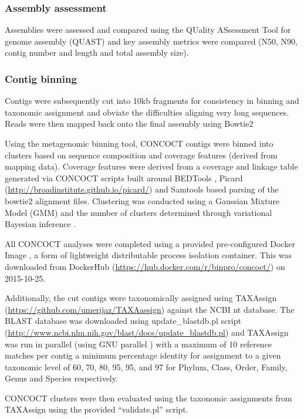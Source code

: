 \subsubsection{Assembly assessment}

Assemblies were assessed and compared using the
QUality ASsessment Tool for genome assembly (QUAST) \citep{Gurevich2013a}
and key assembly metrics were compared (N50, N90, contig number
and length and total assembly size).


\subsubsection{Contig binning}
Contigs were subsequently cut into 10kb fragments for consistency
in binning and taxonomic assignment and obviate the difficulties
aligning very long sequences. 
Reads were then mapped back onto the final assembly using Bowtie2 
\citep{Langmead2012} 

Using the metagenomic binning tool, CONCOCT \citep{Alneberg2014}
contigs were binned into clusters based on sequence composition
and coverage features (derived from mapping data).
Coverage features were derived from a coverage and linkage table
generated via CONCOCT scripts built around BEDTools \citep{Quinlan2010,Quinlan2014}, Picard (\url{http://broadinstitute.github.io/picard/})
and Samtools \citep{Li2009} 
based parsing
of the bowtie2 alignment files.
Clustering was conducted using a Gaussian Mixture Model (GMM) \citep{Bishop2006}
and the number of clusters determined through variational Bayesian inference \citep{Corduneanu2001}.

All CONCOCT analyses were completed using a provided pre-configured 
Docker Image \citep{Merkel2014}, a form of lightweight 
distributable process isolation container.
This was downloaded from DockerHub (\url{https://hub.docker.com/r/binpro/concoct/})
on 2015-10-25.

Additionally, the cut contigs were taxonomically assigned 
using TAXAssign (\url{https://github.com/umerijaz/TAXAassign}) against the NCBI nt database. 
The BLAST database was downloaded using update\_blastdb.pl script (\url{http://www.ncbi.nlm.nih.gov/blast/docs/update_blastdb.pl})
and TAXAssign was run in parallel (using GNU parallel \citep{Tange2011a})
with a maximum of 10 reference matches
per contig a minimum percentage identity for assignment
to a given taxonomic level of 60, 70, 80, 95, 95, and 97
for Phylum, Class, Order, Family, Genus and Species respectively. 

CONCOCT clusters were then evaluated using the taxonomic assignments from TAXAssign
using the provided ``validate.pl'' script.

